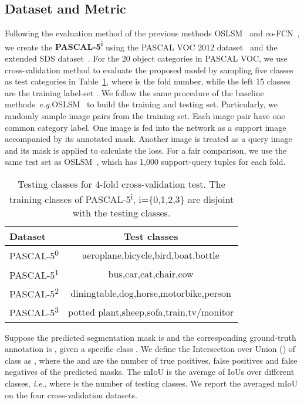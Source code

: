 \documentclass[journal]{IEEEtran}
\newcommand{\eg}{\emph{e.g.}}
\newcommand{\ie}{\emph{i.e.}}
\begin{document}
\subsection{Dataset and Metric}
Following the evaluation method of the previous methods OSLSM~\cite{shaban2017one} and co-FCN~\cite{rakelly2018conditional}, we create the \textbf{PASCAL-5\textsuperscript{i}} using the PASCAL VOC 2012 dataset~\cite{2010-pascal} and the extended SDS dataset~\cite{hariharan2011semantic}. 
For the 20 object categories in PASCAL VOC, we use cross-validation method to evaluate the proposed model by sampling five classes as test categories  in Table~\ref{tab1}, where  is the fold number, while the left 15 classes are the training label-set .
We follow the same procedure of the baseline methods~\eg OSLSM~\cite{shaban2017one} to build the training and testing set. 
Particularly, we randomly sample image pairs from the training set.
Each image pair have one common category label.
One image is fed into the network as a support image accompanied by its annotated mask.
Another image is treated as a query image and its mask is applied to calculate the loss.
For a fair comparison, we use the same test set as OSLSM~\cite{shaban2017one}, which has 1,000 support-query tuples for each fold.

\begin{table}[t]\setlength{\tabcolsep}{19.5pt}
  \centering
  \caption{Testing classes for 4-fold cross-validation test. The training classes of PASCAL-5\textsuperscript{i}, i=\{0,1,2,3\} are disjoint with the testing classes.}\label{tab1}
  \begin{tabular}{l|c}
    \hline
    \hline
    \textbf{Dataset} & \textbf{Test classes} \\
    \hline
    PASCAL-5\textsuperscript{0} & aeroplane,bicycle,bird,boat,bottle \\
PASCAL-5\textsuperscript{1} & bus,car,cat,chair,cow \\
PASCAL-5\textsuperscript{2} & diningtable,dog,horse,motorbike,person \\
PASCAL-5\textsuperscript{3} & potted plant,sheep,sofa,train,tv/monitor \\
    \hline
    \hline
  \end{tabular}
  \vspace{-10pt}
\end{table}

Suppose the predicted segmentation mask is  and the corresponding ground-truth annotation is , given a specific class .
We define the Intersection over Union () of class  as , where the  and  are the number of true positives, false positives and false negatives of the predicted masks.
The mIoU is the average of IoUs over different classes, \ie , where  is the number of testing classes.
We report the averaged mIoU on the four cross-validation datasets.
\end{document}
